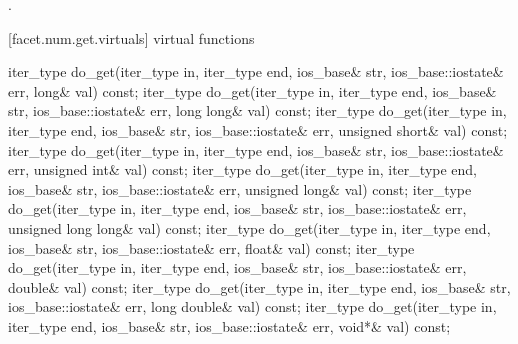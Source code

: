 \begin{itemdescr}
\pnum
\returns
{}.
\end{itemdescr}

[facet.num.get.virtuals]{ virtual functions}

%
\begin{itemdecl}
iter_type do_get(iter_type in, iter_type end, ios_base& str,
  ios_base::iostate& err, long& val) const;
iter_type do_get(iter_type in, iter_type end, ios_base& str,
  ios_base::iostate& err, long long& val) const;
iter_type do_get(iter_type in, iter_type end, ios_base& str,
  ios_base::iostate& err, unsigned short& val) const;
iter_type do_get(iter_type in, iter_type end, ios_base& str,
  ios_base::iostate& err, unsigned int& val) const;
iter_type do_get(iter_type in, iter_type end, ios_base& str,
  ios_base::iostate& err, unsigned long& val) const;
iter_type do_get(iter_type in, iter_type end, ios_base& str,
  ios_base::iostate& err, unsigned long long& val) const;
iter_type do_get(iter_type in, iter_type end, ios_base& str,
  ios_base::iostate& err, float& val) const;
iter_type do_get(iter_type in, iter_type end, ios_base& str,
  ios_base::iostate& err, double& val) const;
iter_type do_get(iter_type in, iter_type end, ios_base& str,
  ios_base::iostate& err, long double& val) const;
iter_type do_get(iter_type in, iter_type end, ios_base& str,
  ios_base::iostate& err, void*& val) const;
\end{itemdecl}

